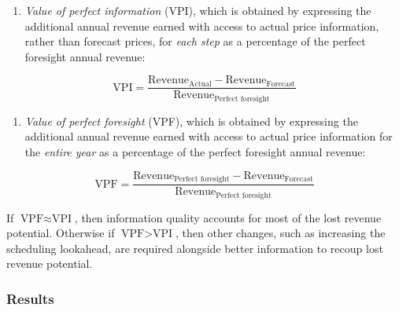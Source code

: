 \documentclass[12pt,a4paper,]{report}
\providecommand{\tightlist}{%
  \setlength{\itemsep}{0pt}\setlength{\parskip}{0pt}}
\begin{document}
\begin{enumerate}
\def\labelenumi{\arabic{enumi}.}
\tightlist
\item
  \emph{Value of perfect information} (VPI), which is obtained by
  expressing the additional annual revenue earned with access to actual
  price information, rather than forecast prices, for \emph{each step }
  as a percentage of the perfect foresight annual revenue:
\end{enumerate}

\[\textrm{VPI} = \frac{\textrm{Revenue}_{\textrm{Actual}} - \textrm{Revenue}_{\textrm{Forecast}}}{\textrm{Revenue}_{\textrm{Perfect foresight}}}\]

\begin{enumerate}
\def\labelenumi{\arabic{enumi}.}
\setcounter{enumi}{1}
\tightlist
\item
  \emph{Value of perfect foresight} (VPF), which is obtained by
  expressing the additional annual revenue earned with access to actual
  price information for the \emph{entire year} as a percentage of the
  perfect foresight annual revenue:
\end{enumerate}

\[\textrm{VPF} = \frac{\textrm{Revenue}_{\textrm{Perfect foresight}} - \textrm{Revenue}_{\textrm{Forecast}}}{\textrm{Revenue}_{\textrm{Perfect foresight}}}\]

If \(\textrm{VPF} \approx \textrm{VPI}\), then information quality
accounts for most of the lost revenue potential. Otherwise if
\(\textrm{VPF} > \textrm{VPI}\), then other changes, such as increasing
the scheduling lookahead, are required alongside better information to
recoup lost revenue potential.

\hypertarget{sec:info-case_study-bess_simulations-method-results}{%
\subsubsection{Results}\label{sec:info-case_study-bess_simulations-method-results}}
\end{document}
